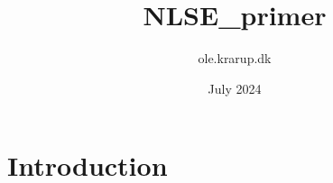 \documentclass{article}
\title{NLSE_primer}
\author{ole.krarup.dk }
\date{July 2024}
\begin{document}
\maketitle

\section{Introduction}
\end{document}
